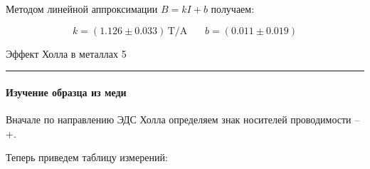 \documentclass[12pt,a4paper]{scrartcl}
\begin{document}
	Методом линейной аппроксимации $B = kI + b$ получаем:
	
	$$k = (1.126 \pm 0.033)\, \text{T}/\text{A} \ \ \ \ \ \ \ \ b = (0.011 \pm 0.019)$$
	
	\newpage
	
	
	\begin{flushleft}
		\footnotesize{Эффект Холла в металлах} \hspace{\fill} \footnotesize{5}
		\\[-0.3cm]\noindent\rule{\textwidth}{0.3pt}
	\end{flushleft}	
	
	\paragraph{Изучение образца из меди} \hfill
	
	Вначале по направлению ЭДС Холла определяем знак носителей проводимости -- +.
	
	Теперь приведем таблицу измерений:
	
\end{document}
